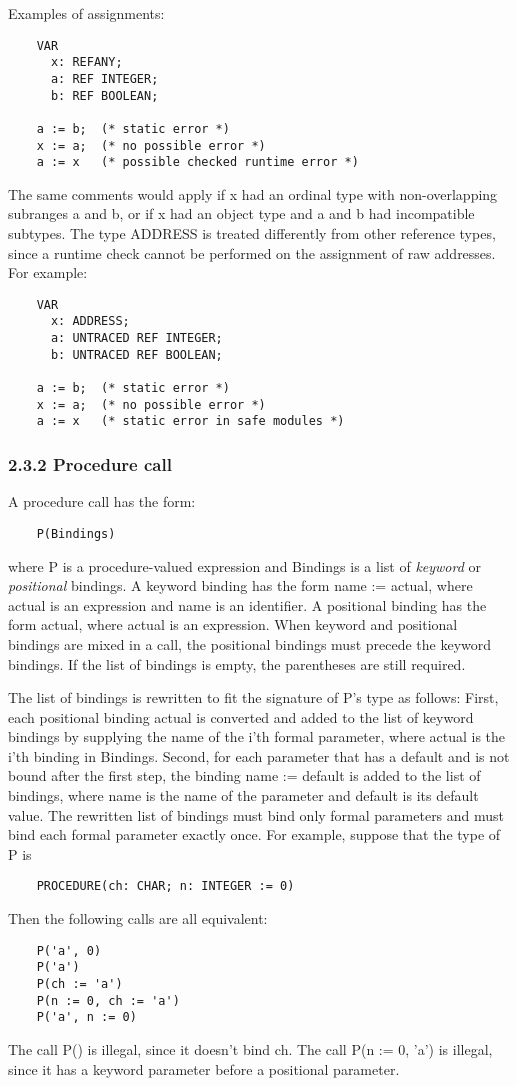 \documentclass[10pt]{article}
\begin{document}
Examples of assignments:
\begin{verbatim}
    VAR
      x: REFANY;
      a: REF INTEGER;
      b: REF BOOLEAN;

    a := b;  (* static error *)
    x := a;  (* no possible error *)
    a := x   (* possible checked runtime error *)
\end{verbatim}

The same comments would apply if x had an ordinal type with non-overlapping
subranges a and b, or if x had an object type and a and b had incompatible
subtypes.  The type ADDRESS is treated differently from other reference types,
since a runtime check cannot be performed on the assignment of raw
addresses.  For example:
\begin{verbatim}
    VAR
      x: ADDRESS;
      a: UNTRACED REF INTEGER;
      b: UNTRACED REF BOOLEAN;

    a := b;  (* static error *)
    x := a;  (* no possible error *)
    a := x   (* static error in safe modules *)
\end{verbatim}

\subsubsection*{2.3.2 Procedure call}

A procedure call has the form:
\begin{verbatim}
    P(Bindings)
\end{verbatim}
where P is a procedure-valued expression and Bindings is a list of
\emph{keyword} or \emph{positional} bindings.  A keyword binding has the form
name := actual, where actual is an expression and name is an identifier.  A
positional binding has the form actual, where actual is an expression.  When
keyword and positional bindings are mixed in a call, the positional bindings
must precede the keyword bindings.  If the list of bindings is empty, the
parentheses are still required.

The list of bindings is rewritten to fit the signature of P's type as follows:
First, each positional binding actual is converted and added to the list of
keyword bindings by supplying the name of the i'th formal parameter, where
actual is the i'th binding in Bindings.  Second, for each parameter that has a
default and is not bound after the first step, the binding name := default is
added to the list of bindings, where name is the name of the parameter and
default is its default value.  The rewritten list of bindings must bind only
formal parameters and must bind each formal parameter exactly once.  For
example, suppose that the type of P is
\begin{verbatim}
    PROCEDURE(ch: CHAR; n: INTEGER := 0)
\end{verbatim}
Then the following calls are all equivalent:
\begin{verbatim}
    P('a', 0)
    P('a')
    P(ch := 'a')
    P(n := 0, ch := 'a')
    P('a', n := 0)
\end{verbatim}
The call P() is illegal, since it doesn't bind ch.  The call P(n := 0, 'a') is
illegal, since it has a keyword parameter before a positional parameter.
\end{document}
